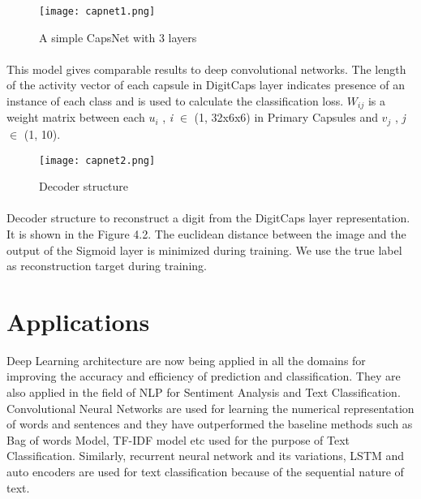 \documentclass[a4paper,12pt]{report}
\begin{document}
\vspace*{1.5cm}
\begin{figure}[!h]
	\begin{center}
		\texttt{[image: capnet1.png]}    
		\caption{A simple CapsNet with 3 layers} 
		\label{fig1}
	\end{center}
\end{figure}
\vspace*{1.5cm}

\paragraph{}
This model gives comparable results to deep convolutional networks. The length of the activity vector of each capsule in DigitCaps layer indicates presence of an instance of each class and is used to calculate the classification loss. $W_{ij}$ is a weight matrix between each $u_i$ , \textit{i} $\in$ (1, 32x6x6) in Primary Capsules and $v_j$ , \textit{j} $\in$ (1, 10). 


\vspace*{0.5cm}
\begin{figure}[!h]
	\begin{center}
		\texttt{[image: capnet2.png]}    
		\caption{Decoder structure}
		\label{fig1}
	\end{center}
\end{figure}
\vspace*{5.5cm}

\paragraph{}
Decoder structure to reconstruct a digit from the DigitCaps layer representation. It is shown in the Figure 4.2. The euclidean distance between the image and the output of the Sigmoid layer is minimized during training. We use the true label as reconstruction target during training.

\section{Applications}
Deep Learning architecture are now being applied in all the domains for improving the accuracy and efficiency of prediction and classification. They are also applied in the field of NLP for Sentiment Analysis and Text Classification. Convolutional Neural Networks are used for learning the numerical representation of words and sentences and they have outperformed the baseline methods such as Bag of words Model, TF-IDF model etc used for the purpose of Text Classification. Similarly, recurrent neural network and its variations, LSTM and auto encoders are used for text classification because of the sequential nature of text.
\end{document}
